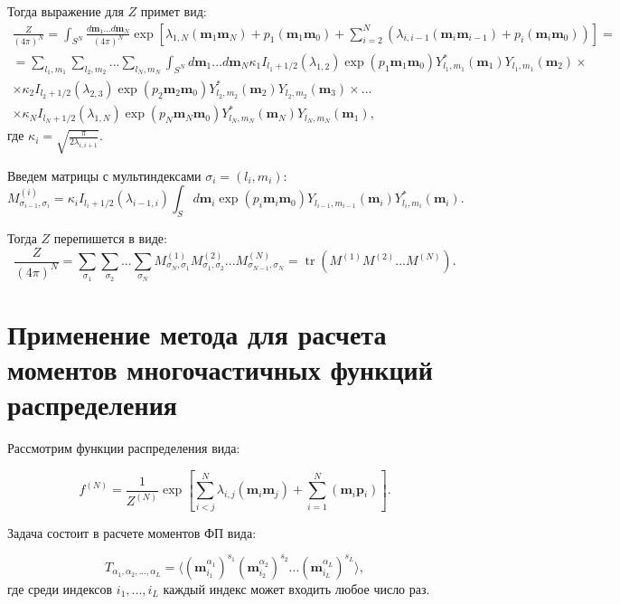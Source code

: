 \documentclass[12pt]{article}
\def\m{\mathbf m{}}
\def\p{\mathbf p{}}
\DeclareMathOperator{\tr}{tr}
\begin{document}
Тогда выражение для $Z$ примет вид:
\begin{multline}
  \frac{Z}{(4\pi)^N} =  \int_{S^N}\frac{d\m_1...d\m_N}{(4\pi)^N} \exp\left[ \lambda_{1,N}(\m_1\m_N)+p_1(\m_1\m_0) + \sum_{i=2}^{N}\left( \lambda_{i,i-1}(\m_i\m_{i-1})+p_i(\m_i\m_0) \right) \right]
  =\\= 
  \sum_{l_1,m_1}\sum_{l_2,m_2}...\sum_{l_N,m_N}\int_{S^N}d \m_1...d \m_N \kappa_1 I_{l_1+1/2}(\lambda_{1,2})\exp(p_1\m_1\m_0)Y^{*}_{l_1, m_1}(\m_1)Y_{l_1, m_1}(\m_2)
  \times\\ \times
  \kappa_2 I_{l_2+1/2}(\lambda_{2,3})\exp(p_2\m_2\m_0)Y^{*}_{l_2, m_2}(\m_2)Y_{l_2, m_2}(\m_3)
  \times ...
  \\
  \times \kappa_N I_{l_N+1/2}(\lambda_{1,N})\exp(p_N\m_N\m_0)Y^{*}_{l_N, m_N}(\m_N)Y_{l_N, m_N}(\m_1),
\end{multline}
где $\kappa_i = \sqrt{\frac{\pi}{2\lambda_{i,i+1}}}$.

Введем матрицы с мультиндексами $\sigma_i = (l_i, m_i)$:
\begin{equation}\label{chain_M:eq}
  M^{(i)}_{\sigma_{i-1}, \sigma_i} = \kappa_i I_{l_i+1/2}(\lambda_{i-1,i}) \int_{S}d\m_i \exp(p_i \m_i\m_0)Y_{l_{i-1},m_{i-1}}(\m_i)Y^{*}_{l_i,m_i}(\m_i).
\end{equation}

Тогда $Z$ перепишется в виде:
\begin{equation}\label{chain:eq}
  \frac{Z}{(4\pi)^N} = \sum_{\sigma_1}\sum_{\sigma_2}...\sum_{\sigma_N} M^{(1)}_{\sigma_N, \sigma_1}M^{(2)}_{\sigma_1, \sigma_2}...M^{(N)}_{\sigma_{N-1}, \sigma_N} = \tr(M^{(1)}M^{(2)}...M^{(N)}).
\end{equation}

\section{Применение метода для расчета моментов многочастичных функций распределения}
Рассмотрим функции распределения вида:


\begin{equation}
  f^{(N)} = \frac{1}{Z^{(N)}} \exp\left[\sum_{i < j}^{N} \lambda_{i,j}(\m_i\m_j) + \sum_{i = 1}^{N} (\m_i\p_i)\right].
\end{equation}

Задача состоит в расчете моментов ФП вида:

\begin{equation}
  T_{\alpha_1, \alpha_2, ..., \alpha_L} = \langle (\m^{ \alpha_1}_{i_1})^{s_1} (\m^{ \alpha_2}_{i_2})^{s_2} ... (\m^{ \alpha_L}_{i_L})^{s_{L}}\rangle,
\end{equation}
где среди индексов $i_1, ..., i_{L}$ каждый индекс может входить любое число раз.
\end{document}
